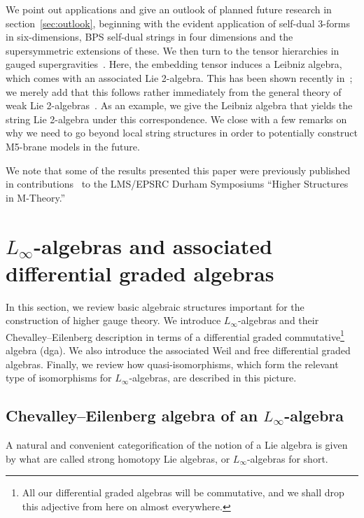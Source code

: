 \documentclass[reqno,a4paper,11pt]{article}
\let\fn\footnote
\renewcommand{\footnote}[1]{\linespread{1.1}\fn{#1}\linespread{1.29}}
\begin{document}
We point out applications and give an outlook of planned future research in section~\ref{sec:outlook}, beginning with the evident application of self-dual 3-forms in six-dimensions, BPS self-dual strings in four dimensions and the supersymmetric extensions of these. We then turn to the tensor hierarchies in gauged supergravities~\cite{deWit:2008ta}. Here, the embedding tensor induces a Leibniz algebra, which comes with an associated Lie 2-algebra. This has been shown recently in~\cite{Sheng:2015:1-5,Kotov:2018vcz}; we merely add that this follows rather immediately from the general theory of weak Lie 2-algebras~\cite{Roytenberg:0712.3461}. As an example, we give the Leibniz algebra that yields the string Lie 2-algebra under this correspondence. We close with a few remarks on why we need to go beyond local string structures in order to potentially construct M5-brane models in the future.

We note that some of the results presented this paper were previously published in contributions~\cite{Schmidt:2019pks} to the LMS/EPSRC Durham Symposiums ``Higher Structures in M-Theory.''

\section{\texorpdfstring{$L_\infty$}{L-infinity}-algebras and associated differential graded algebras}\label{ssec:CE-algebras}

In this section, we review basic algebraic structures important for the construction of higher gauge theory. We introduce $L_\infty$-algebras and their Chevalley--Eilenberg description in terms of a differential graded commutative\footnote{All our differential graded algebras will be commutative, and we shall drop this adjective from here on almost everywhere.} algebra (dga). We also introduce the associated Weil and free differential graded algebras. Finally, we review how quasi-isomorphisms, which form the relevant type of isomorphisms for $L_\infty$-algebras, are described in this picture.

\subsection{Chevalley--Eilenberg algebra of an \texorpdfstring{$L_\infty$}{L-infinity}-algebra}\label{sec:L_infty_algebras}

A natural and convenient categorification of the notion of a Lie algebra is given by what are called strong homotopy Lie algebras, or $L_\infty$-algebras for short. 
\end{document}

